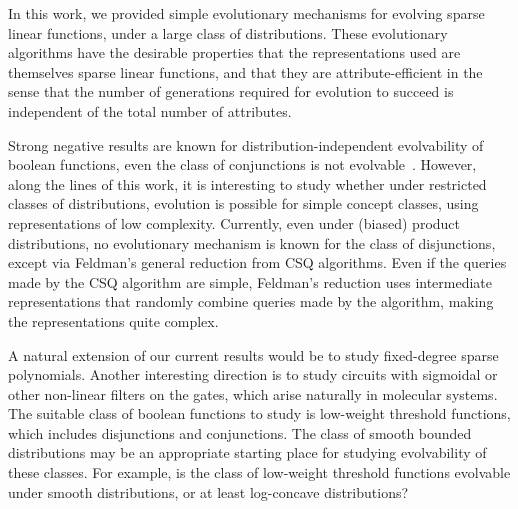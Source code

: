 In this work, we provided simple evolutionary mechanisms for evolving sparse
linear functions, under a large class of distributions. These evolutionary
algorithms have the desirable properties that the representations used are
themselves sparse linear functions, and that they are attribute-efficient in the
sense that the number of generations required for evolution to succeed is
independent of the total number of attributes.

Strong negative results are known for distribution-independent evolvability of
boolean functions, \eg even the class of conjunctions is not
evolvable~\cite{Feldman:2011-LTF}. However, along the lines of this work, it is
interesting to study whether under restricted classes of distributions,
evolution is possible for simple concept classes, using representations of low
complexity. Currently, even under (biased) product distributions, no
evolutionary mechanism is known for the class of disjunctions, except via
Feldman's general reduction from CSQ algorithms. Even if the queries made by the
CSQ algorithm are simple, Feldman's reduction uses intermediate representations
that randomly combine queries made by the algorithm, making the representations
quite complex.

A natural extension of our current results would be to study fixed-degree sparse
polynomials. Another interesting direction is to study circuits with sigmoidal
or other non-linear filters on the gates, which arise naturally in molecular
systems.  The suitable class of boolean functions to study is low-weight
threshold functions, which includes disjunctions and conjunctions. The class of
smooth bounded distributions may be an appropriate starting place for studying
evolvability of these classes. For example, is the class of low-weight threshold
functions evolvable under smooth distributions, or at least log-concave
distributions? 
